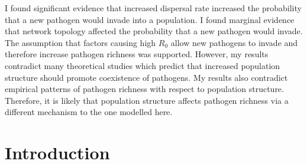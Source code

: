 I found significant evidence that increased dispersal rate increased the probability that a new pathogen would invade into a population.
I found marginal evidence that network topology affected the probability that a new pathogen would invade.
The assumption that factors causing high $R_0$ allow new pathogens to invade and therefore increase pathogen richness was supported.
However, my results contradict many theoretical studies which predict that increased population structure should promote coexistence of pathogens.
My results also contradict empirical patterns of pathogen richness with respect to population structure.
Therefore, it is likely that population structure affects pathogen richness via a different mechanism to the one modelled here.
%
%









\section{Introduction}







